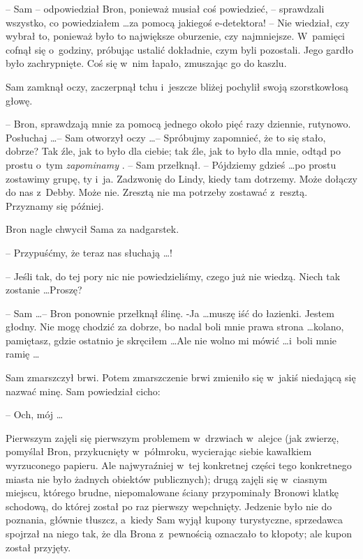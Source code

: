 \documentclass[oneside,polish,11pt,rmheadings]{mwbk}
\begin{document}
-- Sam -- odpowiedział Bron, ponieważ musiał coś powiedzieć, -- sprawdzali wszystko, co powiedziałem \ldots  za pomocą jakiegoś e-detektora! -- Nie wiedział, czy wybrał to, ponieważ było to największe oburzenie, czy najmniejsze. W~pamięci cofnął się o~godziny, próbując ustalić dokładnie, czym byli pozostali. Jego gardło było zachrypnięte. Coś się w~nim łapało, zmuszając go do kaszlu. 

Sam zamknął oczy, zaczerpnął tchu i~jeszcze bliżej pochylił swoją szorstkowłosą głowę. 

-- Bron, sprawdzają mnie za pomocą jednego około pięć razy dziennie, rutynowo. Posłuchaj \ldots  -- Sam otworzył oczy \ldots  -- Spróbujmy zapomnieć, że to się stało, dobrze? Tak źle, jak to było dla ciebie; tak źle, jak to było dla mnie, odtąd po prostu o~tym \textit{zapominamy }. -- Sam przełknął.  -- Pójdziemy gdzieś \ldots  po prostu zostawimy grupę, ty i~ja. Zadzwonię do Lindy, kiedy tam dotrzemy. Może dołączy do nas z~Debby. Może nie. Zresztą nie ma potrzeby zostawać z~resztą. Przyznamy się później. 

Bron nagle chwycił Sama za nadgarstek.

-- Przypuśćmy, że teraz nas słuchają \ldots ! 

-- Jeśli tak, do tej pory nic nie powiedzieliśmy, czego już nie wiedzą. Niech tak zostanie \ldots  Proszę? 

-- Sam \ldots  -- Bron ponownie przełknął ślinę. -Ja \ldots   muszę iść do łazienki. Jestem głodny. Nie mogę chodzić za dobrze, bo nadal boli mnie prawa strona \ldots  kolano, pamiętasz, gdzie ostatnio je skręciłem \ldots  Ale nie wolno mi mówić \ldots  i~boli mnie ramię \ldots  

Sam zmarszczył brwi. Potem zmarszczenie brwi zmieniło się w~jakiś niedającą się nazwać minę. Sam powiedział cicho: 

-- Och, mój \ldots  

Pierwszym zajęli się pierwszym problemem w~drzwiach w~alejce (jak zwierzę, pomyślał Bron, przykucnięty w~półmroku, wycierając siebie kawałkiem wyrzuconego papieru. Ale najwyraźniej w~tej konkretnej części tego konkretnego miasta nie było żadnych obiektów publicznych); drugą zajęli się w~ciasnym miejscu, którego brudne, niepomalowane ściany przypominały Bronowi klatkę schodową, do której został po raz pierwszy wepchnięty. Jedzenie było nie do poznania, głównie tłuszcz, a~kiedy Sam wyjął kupony turystyczne, sprzedawca spojrzał na niego tak, że dla Brona z~pewnością oznaczało to kłopoty; ale kupon został przyjęty. 
\end{document}
